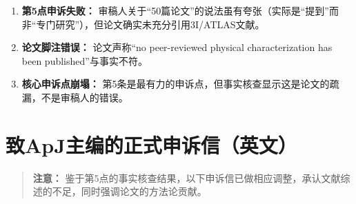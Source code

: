\documentclass[12pt,a4paper]{article}
\begin{document}
\begin{enumerate}
    \item \textbf{第5点申诉失败：} 审稿人关于``50篇论文''的说法虽有夸张（实际是``提到''而非``专门研究''），但论文确实未充分引用3I/ATLAS文献。

    \item \textbf{论文脚注错误：} 论文声称``no peer-reviewed physical characterization has been published''与事实不符。

    \item \textbf{核心申诉点崩塌：} 第5条是最有力的申诉点，但事实核查显示这是论文的疏漏，不是审稿人的错误。
\end{enumerate}

\newpage
\section{致ApJ主编的正式申诉信（英文）}

\begin{quote}
\textbf{注意：} 鉴于第5点的事实核查结果，以下申诉信已做相应调整，承认文献综述的不足，同时强调论文的方法论贡献。
\end{quote}

\vspace{0.5cm}
\end{document}
